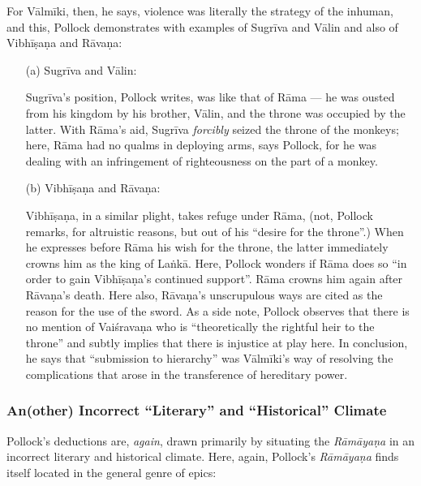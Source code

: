 For Vālmīki, then, he says, violence was literally the strategy of the inhuman, and this, Pollock demonstrates with examples of Sugrīva and Vālin and also of Vibhīṣaṇa and Rāvaṇa: 
\begin{itemize}
\itemsep=0pt
\item[(a)] Sugrīva and Vālin:

Sugrīva’s position, Pollock writes, was like that of Rāma --- he was ousted from his kingdom by his brother, Vālin, and the throne was occupied by the latter. With Rāma’s aid, Sugrīva {\sl forcibly} seized the throne of the monkeys; here, Rāma had no qualms in deploying arms, says Pollock, for he was dealing with an infringement of righteousness on the part of a monkey. 

\item[(b)] Vibhīṣaṇa and Rāvaṇa: 

Vibhīṣaṇa, in a similar plight, takes refuge under Rāma, (not, Pollock remarks, for altruistic reasons, but out of his “desire for the throne”.) When he expresses before Rāma his wish for the throne, the latter immediately crowns him as the king of Laṅkā. Here, Pollock wonders if Rāma does so “in order to gain Vibhīṣaṇa’s continued support”. Rāma crowns him again after Rāvaṇa’s death. Here also, Rāvaṇa’s unscrupulous ways are cited as the reason for the use of the sword. As a side note, Pollock observes that there is no mention of Vaiśravaṇa who is “theoretically the rightful heir to the throne” and subtly implies that there is injustice at play here. In conclusion, he says that “submission to hierarchy” was Vālmīki’s way of resolving the complications that arose in the transference of hereditary power. 
\end{itemize}

\subsubsection{An(other) Incorrect “Literary” and “Historical” Climate}\label{sec1.2.3.1}

Pollock’s deductions are, {\sl again}, drawn primarily by situating the {\sl Rāmāyaṇa} in an incorrect literary and historical climate. Here, again, Pollock’s {\sl Rāmāyaṇa} finds itself located in the general genre of epics:

